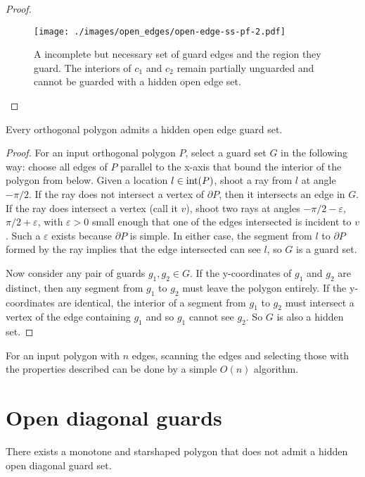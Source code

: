 \documentclass{cccg12}
\begin{document}
\begin{proof}
\begin{figure}[ht]
\centering
\texttt{[image: ./images/open\_edges/open-edge-ss-pf-2.pdf]}
\caption{A incomplete but necessary set of guard edges and the region they guard. 
The interiors of $c_1$ and $c_2$ remain partially unguarded and cannot be guarded with a hidden open edge set.}
\label{fig:open-edge-ss-pf-2}
\end{figure}

\end{proof}

\begin{lemma}
\label{lem:hidden-open-edge-ortho}
Every orthogonal polygon admits a hidden open edge guard set.
\end{lemma}

\begin{proof}
For an input orthogonal polygon $P$, select a guard set $G$ in the following way: choose all edges of $P$ parallel to the x-axis that bound the interior of the polygon from below. 
Given a location $l \in {\rm int}(P)$, shoot a ray from $l$ at angle $-\pi/2$.
If the ray does not intersect a vertex of $\partial P$, then it intersects an edge in $G$.
If the ray does intersect a vertex (call it $v$), shoot two rays at angles $-\pi/2 - \varepsilon$, $\pi/2 + \varepsilon$, with $\varepsilon > 0$ small enough that one of the edges intersected is incident to $v$.
Such a $\varepsilon$ exists because $\partial P$ is simple.
In either case, the segment from $l$ to $\partial P$ formed by the ray implies that the edge intersected can see $l$, so $G$ is a guard set. 

Now consider any pair of guards $g_1, g_2 \in G$.
If the y-coordinates of $g_1$ and $g_2$ are distinct, then any segment from $g_1$ to $g_2$ must leave the polygon entirely.
If the y-coordinates are identical, the interior of a segment from $g_1$ to $g_2$ must intersect a vertex of the edge containing $g_1$ and so $g_1$ cannot see $g_2$.
So $G$ is also a hidden set.
\end{proof}

For an input polygon with $n$ edges, scanning the edges and selecting those with the properties described can be done by a simple $O(n)$ algorithm.

\section{Open diagonal guards}

\begin{lemma}
There exists a monotone and starshaped polygon that does not admit a hidden open diagonal guard set.
\end{lemma}
\end{document}
